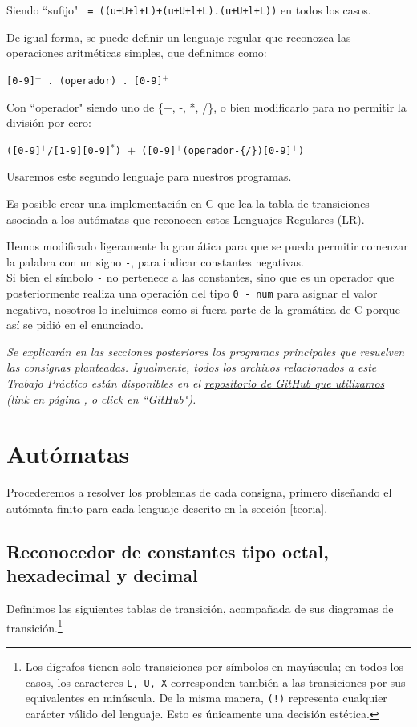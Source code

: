 \documentclass[a4paper, 12pt]{article}
\begin{document}
Siendo ``sufijo" \verb| = ((u+U+l+L)+(u+U+l+L).(u+U+l+L))| en todos los casos.

De igual forma, se puede definir un lenguaje regular que reconozca las operaciones aritméticas simples, que definimos como:
\begin{center}
    \texttt{[0-9]$^+$ . (operador) . [0-9]$^+$}
\end{center}
Con ``operador" siendo uno de \{+, -, *, /\}, o bien modificarlo para no permitir la división por cero:

\begin{center}
    \texttt{([0-9]$^+$/[1-9][0-9]$^*$) $+$ ([0-9]$^+$(operador-\{/\})[0-9]$^+$)}
\end{center}

Usaremos este segundo lenguaje para nuestros programas.

Es posible crear una implementación en C que lea la tabla de transiciones asociada a los autómatas que reconocen estos Lenguajes Regulares (LR).

Hemos modificado ligeramente la gramática para que se pueda permitir comenzar la palabra con un signo \texttt{-}, para indicar constantes negativas. \\
Si bien el símbolo \texttt{-} no pertenece a las constantes, sino que es un operador que posteriormente realiza una operación del tipo \texttt{0 - num} para asignar el valor negativo, nosotros lo incluimos como si fuera parte de la gramática de C porque así se pidió en el enunciado.

\begin{large}
\emph{Se explicarán en las secciones posteriores los programas principales que resuelven las consignas planteadas. Igualmente, todos los archivos relacionados a este Trabajo Práctico están disponibles en el \hyperref[repo]{repositorio de GitHub que utilizamos} (link en página \pageref{repo}, o click en ``GitHub").}
\end{large}

\section{Autómatas}
\bigbreak


Procederemos a resolver los problemas de cada consigna, primero diseñando el autómata finito para cada lenguaje descrito en la sección \ref{teoria}.

\subsection{Reconocedor de constantes tipo octal, hexadecimal y decimal} \label{ej-constantes}
\medbreak
Definimos las siguientes tablas de transición, acompañada de sus diagramas de transición.\footnote{Los dígrafos tienen solo transiciones por símbolos en mayúscula; en todos los casos, los caracteres \texttt{L, U, X} corresponden también a las transiciones por sus equivalentes en minúscula. De la misma manera, \texttt{(!)} representa cualquier carácter válido del lenguaje. Esto es únicamente una decisión estética.}
\end{document}
